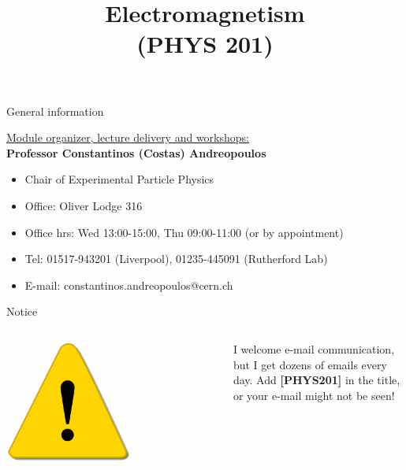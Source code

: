\renewcommand{\prevlecture}{0}
\renewcommand{\thislecture}{0}
\renewcommand{\nextlecture}{1}

%
%

\title[PHYS 201]
{
  \Huge{Electromagnetism}\\(PHYS 201)\\
}



\begin{frame}[plain]
  \titlepage
\end{frame}


%
%

\begin{frame}{General information}

\underline{Module organizer, lecture delivery and workshops:}\\
\vspace{0.2cm}
{\bf Professor Constantinos (Costas) Andreopoulos}
\vspace{0.2cm}
\begin{itemize}
\item Chair of Experimental Particle Physics
\item Office: Oliver Lodge 316
\item Office hrs: Wed 13:00-15:00, Thu 09:00-11:00 (or by appointment)
\item Tel: 01517-943201 (Liverpool), 01235-445091 (Rutherford Lab)
\item E-mail: constantinos.andreopoulos@cern.ch
\end{itemize}

\begin{block001}{Notice}
\begin{columns}
  \begin{column}{0.15\textwidth}
   \begin{center}
     \includegraphics[width=0.60\textwidth]{./images/icons/warning.png}\\
   \end{center}
  \end{column}
  \begin{column}{0.85\textwidth}
  {\small
     I welcome e-mail communication, but I get dozens of emails every day.
     Add {\bf [PHYS201]} in the title, or your e-mail might not be seen!
   }
  \end{column}
\end{columns}
\end{block001}


\end{frame}
